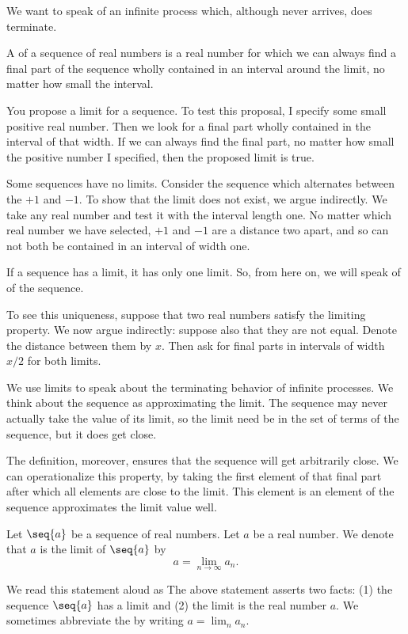 

We want to speak of an
infinite process which,
although never arrives,
does terminate.


A
of a sequence of real
numbers is a real number
for which we can always
find a final part of the
sequence wholly contained
in an interval around the limit,
no matter how small the interval.

You propose a limit
for a sequence.
To test this proposal,
I specify some small
positive real number.
Then we look for a
final part wholly contained
in the interval of that
width.
If we can always find the
final part, no matter
how small the positive
number I specified,
then the proposed limit
is true.


Some sequences have no
limits.
Consider the sequence
which alternates between
the $+1$
and $-1$.
To show that the limit
does not exist, we
argue indirectly.
We take any real
number and test it
with the interval length
one.
No matter which
real number we have
selected,
$+1$ and
$-1$ are a
distance two apart,
and so can not
both be contained
in an interval
of width one.


If a sequence has a limit,
it has only one limit.
So, from here on, we will speak
of  of
the sequence.

To see this uniqueness,
suppose that two
real numbers satisfy the
limiting property.
We now argue indirectly:
suppose also that they are
not equal.
Denote the distance between
them by $x$.
Then ask for final parts
in intervals of width $x/2$
for both limits.


We use limits to speak about
the terminating behavior of
infinite processes.
We think about the sequence
as approximating the limit.
The sequence may never
actually take the value
of its limit, so the
limit need be in the
set of terms of the sequence,
but it does get close.

The definition, moreover,
ensures that the sequence
will get arbitrarily close.
We can operationalize this
property, by taking the first
element of that final part
after which all elements are
close to the limit.
This element is an element
of the sequence approximates
the limit value well.


Let $\seq{a}$
be a sequence of
real numbers.
Let $a$ be a real number.
We denote that $a$ is the limit of
$\seq{a}$ by
\[
  a = \lim_{n \to \infty} a_n.
\]

We read this statement aloud as
The above statement asserts two
facts: (1) the sequence
$\seq{a}$ has a limit and (2)
the limit is the real number $a$.
We sometimes abbreviate
the by writing
$a = \lim_{n} a_n$.
